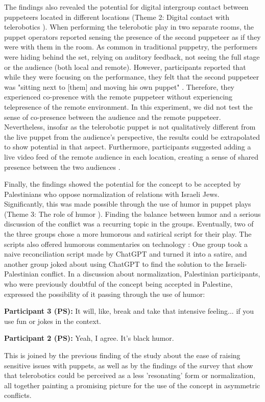 \documentclass[dissertation,math,vertlayout,pdfa,colorlinks,nologo]{aaltoseries}
\begin{document}
The findings also revealed the potential for digital intergroup contact between puppeteers located in different locations (Theme 2: Digital contact with telerobotics \cite[p. 16]{peledTeleroboticTheaterOppressed2025}). When performing the telerobotic play in two separate rooms, the puppet operators reported sensing the presence of the second puppeteer as if they were with them in the room. As common in traditional puppetry, the performers were hiding behind the set, relying on auditory feedback, not seeing the full stage or the audience (both local and remote). However, participants reported that while they were focusing on the performance, they felt that the second puppeteer was "sitting next to [them] and moving his own puppet" \cite[p. 16]{peledTeleroboticTheaterOppressed2025}. Therefore, they experienced co-presence with the remote puppeteer without experiencing telepresence of the remote environment. In this experiment, we did not test the sense of co-presence between the audience and the remote puppeteer. Nevertheless, insofar as the telerobotic puppet is not qualitatively different from the live puppet from the audience's perspective, the results could be extrapolated to show potential in that aspect. Furthermore, participants suggested adding a live video feed of the remote audience in each location, creating a sense of shared presence between the two audiences \cite[p. 16]{peledTeleroboticTheaterOppressed2025}.

Finally, the findings showed the potential for the concept to be accepted by Palestinians who oppose normalization of relations with Israeli Jews. Significantly, this was made possible through the use of humor in puppet plays (Theme 3: The role of humor \cite[p. 17]{peledTeleroboticTheaterOppressed2025}). Finding the balance between humor and a serious discussion of the conflict was a recurring topic in the groups. Eventually, two of the three groups chose a more humorous and satirical script for their play. The scripts also offered humorous commentaries on technology \cite[p. 12]{peledTeleroboticTheaterOppressed2025}: One group took a naive reconciliation script made by ChatGPT and turned it into a satire, and another group joked about using ChatGPT to find the solution to the Israeli-Palestinian conflict. In a discussion about normalization, Palestinian participants, who were previously doubtful of the concept being accepted in Palestine, expressed the possibility of it passing through the use of humor:
\begin{displayquote}
\textbf{Participant 3 (PS):} It will, like, break and take that intensive feeling... if you use fun or jokes in the context. 

\textbf{Participant 2 (PS):} Yeah, I agree. It's black humor.
\end{displayquote}
This is joined by the previous finding of the study about the ease of raising sensitive issues with puppets, as well as by the findings of the survey that show that telerobotics could be perceived as a less 'resonating' form or normalization, all together painting a promising picture for the use of the concept in asymmetric conflicts.
\end{document}
